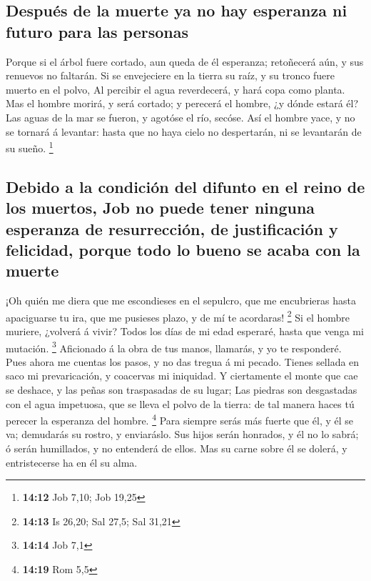 \hypertarget{despuuxe9s-de-la-muerte-ya-no-hay-esperanza-ni-futuro-para-las-personas}{%
\subsection{Después de la muerte ya no hay esperanza ni futuro para las
personas}\label{despuuxe9s-de-la-muerte-ya-no-hay-esperanza-ni-futuro-para-las-personas}}

 Porque si el árbol fuere cortado, aun queda de él
esperanza; retoñecerá aún, y sus renuevos no faltarán.  Si
se envejeciere en la tierra su raíz, y su tronco fuere muerto en el
polvo,  Al percibir el agua reverdecerá, y hará copa como
planta.  Mas el hombre morirá, y será cortado; y perecerá
el hombre, ¿y dónde estará él?  Las aguas de la mar se
fueron, y agotóse el río, secóse.  Así el hombre yace, y no
se tornará á levantar: hasta que no haya cielo no despertarán, ni se
levantarán de su sueño. \footnote{\textbf{14:12} Job 7,10; Job 19,25}

\hypertarget{debido-a-la-condiciuxf3n-del-difunto-en-el-reino-de-los-muertos-job-no-puede-tener-ninguna-esperanza-de-resurrecciuxf3n-de-justificaciuxf3n-y-felicidad-porque-todo-lo-bueno-se-acaba-con-la-muerte}{%
\subsection{Debido a la condición del difunto en el reino de los
muertos, Job no puede tener ninguna esperanza de resurrección, de
justificación y felicidad, porque todo lo bueno se acaba con la
muerte}\label{debido-a-la-condiciuxf3n-del-difunto-en-el-reino-de-los-muertos-job-no-puede-tener-ninguna-esperanza-de-resurrecciuxf3n-de-justificaciuxf3n-y-felicidad-porque-todo-lo-bueno-se-acaba-con-la-muerte}}

 ¡Oh quién me diera que me escondieses en el sepulcro, que
me encubrieras hasta apaciguarse tu ira, que me pusieses plazo, y de mí
te acordaras! \footnote{\textbf{14:13} Is 26,20; Sal 27,5; Sal 31,21}
 Si el hombre muriere, ¿volverá á vivir? Todos los días de
mi edad esperaré, hasta que venga mi mutación. \footnote{\textbf{14:14}
  Job 7,1}  Aficionado á la obra de tus manos, llamarás, y
yo te responderé.  Pues ahora me cuentas los pasos, y no
das tregua á mi pecado.  Tienes sellada en saco mi
prevaricación, y coacervas mi iniquidad.  Y ciertamente el
monte que cae se deshace, y las peñas son traspasadas de su lugar;
 Las piedras son desgastadas con el agua impetuosa, que se
lleva el polvo de la tierra: de tal manera haces tú perecer la esperanza
del hombre. \footnote{\textbf{14:19} Rom 5,5}  Para siempre
serás más fuerte que él, y él se va; demudarás su rostro, y enviaráslo.
 Sus hijos serán honrados, y él no lo sabrá; ó serán
humillados, y no entenderá de ellos.  Mas su carne sobre él
se dolerá, y entristecerse ha en él su alma.

